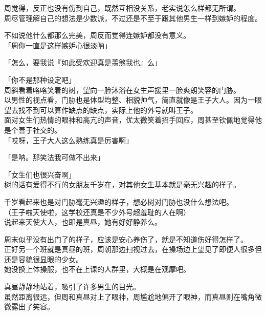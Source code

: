 周觉得，反正也没有伤到自己，既然互相没关系，老实说怎么样都无所谓。\\

周尽管理解自己的想法是少数派，不过还是不至于跟其他男生一样到嫉妒的程度。

不如说他什么都那么完美，周反而觉得连嫉妒都没有意义。\\

「周你一直是这样嫉妒心很淡呐」

「怎么，要我说『如此受欢迎真是羡煞我也』么」

「你不是那种设定吧」\\

周斜看着咯咯笑着的树，望向一脸沐浴在女生声援里一脸爽朗笑容的门胁。\\

以男性的视点看，门胁也是体型均整、相貌帅气，简直就像是王子大人。因为一眼望去找不到可以算作缺点的缺点，实际上他的外号就叫王子。\\

面对女生们热情的眼神和高亢的声音，优太微笑着招手回应，周甚至钦佩地觉得他是个善于社交的。\\

「哎呀，王子大人这么熟练真是厉害啊」

「是呐。那笑法我可做不出来」

「女生们也很兴奋啊」\\

树的话有爱得不行的女朋友千岁在，对其他女生基本就是毫无兴趣的样子。

千岁看起来也是对门胁毫无兴趣的样子，想必树对门胁也没什么想法吧。\\

（王子啦天使啦，这学校还真是不少外号超羞耻的人在啊）\\

说起来天使大人，也即是真昼，她有好好静养么。

周末似乎没有出门了的样子，应该是安心养伤了，就是不知道伤好得怎样了。\\

正好另一个班就是真昼的班，周朝那边扫视过去，在操场边上望见了即便人很多但还是容貌很显眼的少女。\\

她没换上体操服，也不在上课的人群里，大概是在观摩吧。

真昼静静地站着，吸引了许多男生的目光。\\

虽然距离很远，但周和真昼对上了眼神，周尴尬地偏开了眼神，而真昼则在嘴角微微露出了笑容。\\

